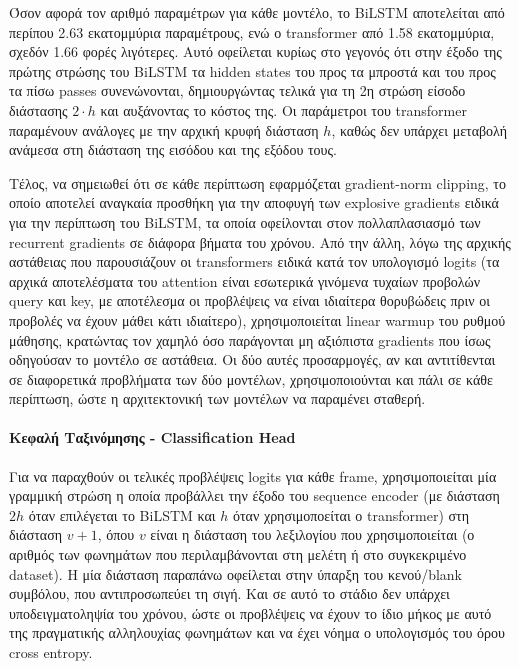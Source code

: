 Όσον αφορά τον αριθμό παραμέτρων για κάθε μοντέλο, το BiLSTM αποτελείται από περίπου 2.63 εκατομμύρια παραμέτρους, ενώ ο transformer από 1.58 εκατομμύρια, σχεδόν 1.66 φορές λιγότερες. Αυτό οφείλεται κυρίως στο γεγονός ότι στην έξοδο της πρώτης στρώσης του BiLSTM τα hidden states του προς τα μπροστά και του προς τα πίσω passes συνενώνονται, δημιουργώντας τελικά για τη 2η στρώση είσοδο διάστασης $2\cdot h$ και αυξάνοντας το κόστος της. Οι παράμετροι του transformer παραμένουν ανάλογες με την αρχική κρυφή διάσταση $h$, καθώς δεν υπάρχει μεταβολή ανάμεσα στη διάσταση της εισόδου και της εξόδου τους.

Τέλος, να σημειωθεί ότι σε κάθε περίπτωση εφαρμόζεται gradient-norm clipping, το οποίο αποτελεί αναγκαία προσθήκη για την αποφυγή των explosive gradients ειδικά για την περίπτωση του BiLSTM, τα οποία οφείλονται στον πολλαπλασιασμό των recurrent gradients σε διάφορα βήματα του χρόνου. Από την άλλη, λόγω της αρχικής αστάθειας που παρουσιάζουν οι transformers ειδικά κατά τον υπολογισμό logits (τα αρχικά αποτελέσματα του attention είναι εσωτερικά γινόμενα τυχαίων προβολών query και key, με αποτέλεσμα οι προβλέψεις να είναι ιδιαίτερα θορυβώδεις πριν οι προβολές να έχουν μάθει κάτι ιδιαίτερο), χρησιμοποιείται linear warmup του ρυθμού μάθησης, κρατώντας τον χαμηλό όσο παράγονται μη αξιόπιστα gradients που ίσως οδηγούσαν το μοντέλο σε αστάθεια. Οι δύο αυτές προσαρμογές, αν και αντιτίθενται σε διαφορετικά προβλήματα των δύο μοντέλων, χρησιμοποιούνται και πάλι σε κάθε περίπτωση, ώστε η αρχιτεκτονική των μοντέλων να παραμένει σταθερή.

\paragraph{Κεφαλή Ταξινόμησης - Classification Head}

Για να παραχθούν οι τελικές προβλέψεις logits για κάθε frame, χρησιμοποιείται μία γραμμική στρώση η οποία προβάλλει την έξοδο του sequence encoder (με διάσταση $2h$ όταν επιλέγεται το BiLSTM και $h$ όταν χρησιμοποείται ο transformer) στη διάσταση $v+1$, όπου $v$ είναι η διάσταση του λεξιλογίου που χρησιμοποιείται (ο αριθμός των φωνημάτων που περιλαμβάνονται στη μελέτη ή στο συγκεκριμένο dataset). Η μία διάσταση παραπάνω οφείλεται στην ύπαρξη του κενού/blank συμβόλου, που αντιπροσωπεύει τη σιγή. Και σε αυτό το στάδιο δεν υπάρχει υποδειγματοληψία του χρόνου, ώστε οι προβλέψεις να έχουν το ίδιο μήκος με αυτό της πραγματικής αλληλουχίας φωνημάτων και να έχει νόημα ο υπολογισμός του όρου cross entropy. 


